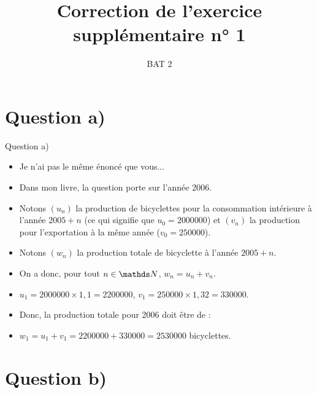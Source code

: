 \documentclass[french,onlymath]{beamer}
\title{Correction de l'exercice supplémentaire n° 1}
\author{BAT 2}\institute{Lycée Jean Pierre Timbaud}
\date{}
\begin{document}

\begin{frame}
 \titlepage
\end{frame}
\section{Question a)}
\begin{frame}{Question a)}

\begin{itemize}
 	
	\item Je n'ai pas le même énoncé que vous...
	
	\item Dans mon livre, la question porte sur l'année 2006.
	
	\item Notons $(u_n)$ la production de bicyclettes pour la consommation intérieure à l'année $2005+n$ (ce qui signifie que $u_0=2 000 000$) et $(v_n)$ la production pour l'exportation à la même année ($v_0=250 000$).
	
	\item Notons $(w_n)$ la production totale de bicyclette à l'année $2005+n$.
	
	\item On a donc, pour tout $n \in \N$, $w_n=u_n+v_n$.
	
	\item $u_1=2 000 000 \times 1,1 = 2 200 000$, $v_1=250 000 \times 1,32 = 330 000$.
	
	\item Donc, la production totale pour 2006 doit être de :
	
	\item $w_1=u_1+v_1=2 200 000+330 000=2 530 000$ bicyclettes.
	
	\end{itemize}
\end{frame}


\section{Question b)}
\end{document}

